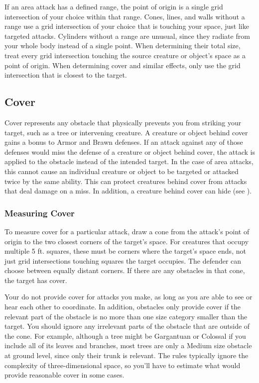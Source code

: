     If an area attack has a defined range, the point of origin is a single grid intersection of your choice within that range.
    Cones, lines, and walls without a range use a grid intersection of your choice that is touching your space, just like targeted attacks.
    Cylinders without a range are unusual, since they radiate from your whole body instead of a single point.
    When determining their total size, treat every grid intersection touching the source creature or object's space as a point of origin.
    When determining cover and similar effects, only use the grid intersection that is closest to the target.

  \subsection{Cover}\label{Cover}

    Cover represents any obstacle that physically prevents you from striking your target, such as a tree or intervening creature.
    A creature or object behind cover gains a  bonus to Armor and Brawn defenses.
    If an attack against any of those defenses would miss the defense of a creature or object behind cover, the attack is applied to the obstacle instead of the intended target.
    In the case of area attacks, this cannot cause an individual creature or object to be targeted or attacked twice by the same ability.
    This can protect creatures behind cover from attacks that deal damage on a miss.
    In addition, a creature behind cover can hide (see ).

    \subsubsection{Measuring Cover}
      To measure cover for a particular attack, draw a cone from the attack's point of origin to the two closest corners of the target's space.
      For creatures that occupy multiple 5 ft. squares, these must be corners where the target's space ends, not just grid intersections touching squares the target occupies.
      The defender can choose between equally distant corners.
      If there are any obstacles in that cone, the target has cover.

      Your  do not provide cover for attacks you make, as long as you are able to see or hear each other to coordinate.
      In addition, obstacles only provide cover if the relevant part of the obstacle is no more than one size category smaller than the target.
      You should ignore any irrelevant parts of the obstacle that are outside of the cone.
      For example, although a tree might be Gargantuan or Colossal if you include all of its leaves and branches, most trees are only a Medium size obstacle at ground level, since only their trunk is relevant.
      The rules typically ignore the complexity of three-dimensional space, so you'll have to estimate what would provide reasonable cover in some cases.


